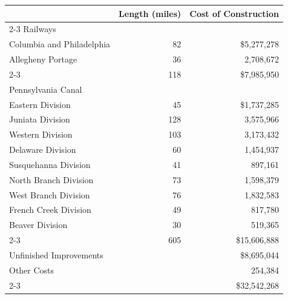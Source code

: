 \documentclass[11pt]{article}
\newcommand{\STRUT}{\rule{0in}{3ex}}
\begin{document}
\begin{center}
\begin{tabular}{lrr}
    & Length (miles) & Cost of Construction \\
\cline{2-3}
{\sc Railways} \\
\hspace{3mm} Columbia and Philadelphia        &  82  & \$5,277,278\STRUT\\
\hspace{3mm} Allegheny Portage                &  36  &   2,708,672\\
\cline{2-3}
\hspace{6mm}{\em Railway Total}              & 118  & \$7,985,950\\

{\sc Pennsylvania Canal}\STRUT \\
\hspace{3mm} Eastern Division  &  45  & \$1,737,285\STRUT\\
\hspace{3mm} Juniata Division  & 128  &   3,575,966\\
\hspace{3mm} Western Division  & 103  &   3,173,432\\
\hspace{3mm} Delaware Division &  60  &   1,454,937\\
\hspace{3mm} Susquehanna Division  &  41 &    897,161\\
\hspace{3mm} North Branch Division &  73 &  1,598,379\\
\hspace{3mm} West Branch Division  &  76 &  1,832,583\\
\hspace{3mm} French Creek Division &  49 &    817,780\\
\hspace{3mm} Beaver Division       &  30 &    519,365\\
\cline{2-3}
\hspace{6mm}{\em Canal Total}  & 605  & \$15,606,888\\

Unfinished Improvements  &     & \$8,695,044\STRUT\\
Other Costs              &     &     254,384\\
\cline{2-3}
\hspace{6mm}{\em Grand Total} & & \$32,542,268\\
\end{tabular}
\end{center}
\end{document}
